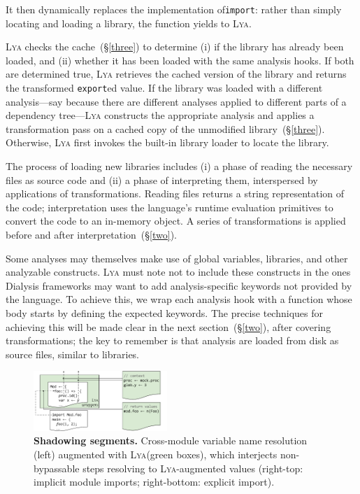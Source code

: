 \documentclass[letterpaper,twocolumn,10pt]{article}
\def\omit#1{}
\newcommand{\ttt}[1]{\texttt{#1}}
\newcommand{\sx}[1]{(\S\ref{#1})}
\newcommand{\sys}{{\scshape Lya}\xspace}
\newcommand{\pc}{PIC\xspace}
\newcommand{\fixme}[1]{{\color{red}#1}}
\begin{document}
It then dynamically replaces the implementation of\ttt{import}:
  rather than simply locating and loading a library, the function yields to \sys.

\sys checks the cache~\sx{three} to determine (i) if the library has already been loaded, and (ii) whether it has been loaded with the same analysis hooks.
If both are determined true, \sys retrieves the cached version of the library and returns the transformed \ttt{export}ed value.
If the library was loaded with a different analysis---say because there are different analyses applied to different parts of a dependency tree---\sys constructs the appropriate analysis and applies a transformation pass on a cached copy of the unmodified library~\sx{three}.
Otherwise, \sys first invokes the built-in library loader to locate the library.

The process of loading new libraries includes (i) a phase of reading the necessary files as source code and (ii) a phase of interpreting them, interspersed by applications of transformations.
Reading files returns a string representation of the code; interpretation uses the language's runtime evaluation primitives to convert the code to an in-memory object.
A series of transformations is applied before and after interpretation~\sx{two}.

Some analyses may themselves make use of global variables, libraries, and other analyzable constructs.
\sys must note not to include these constructs in the ones 
Dialysis frameworks may want to add analysis-specific keywords not provided by the language.
To achieve this, \fixme{we} wrap each analysis hook with a function whose body starts by defining the expected keywords.
The precise techniques for achieving this will be made clear in the next section~\sx{two}, after covering transformations;
  the key to remember is that analysis are loaded from disk as source files, similar to libraries.

\begin{figure}[t]
\centering 
\includegraphics[width=0.45\textwidth]{./figs/lya_shadowing.pdf}
\caption{
  \textbf{Shadowing segments.}
  \textmd{
  Cross-module variable name resolution (left) augmented with \sys (green boxes), which interjects non-bypassable steps resolving to \sys-augmented values (right-top: implicit module imports; right-bottom: explicit import).
  }
  \vspace{-4mm}
}
\label{fig:shadowing}
\end{figure}
\end{document}
